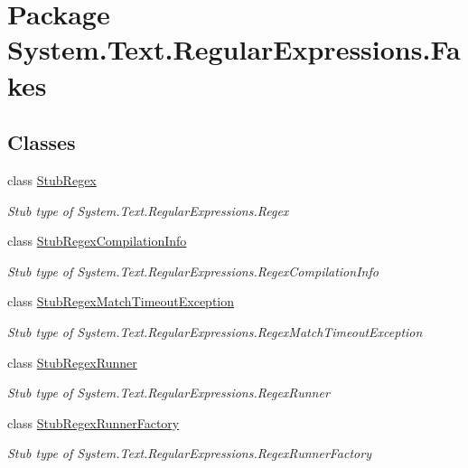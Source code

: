 \hypertarget{namespace_system_1_1_text_1_1_regular_expressions_1_1_fakes}{\section{Package System.\-Text.\-Regular\-Expressions.\-Fakes}
\label{namespace_system_1_1_text_1_1_regular_expressions_1_1_fakes}
}
\subsection*{Classes}
\begin{DoxyCompactItemize}
\item 
class \hyperlink{class_system_1_1_text_1_1_regular_expressions_1_1_fakes_1_1_stub_regex}{Stub\-Regex}
\begin{DoxyCompactList}\small\item\em Stub type of System.\-Text.\-Regular\-Expressions.\-Regex\end{DoxyCompactList}\item 
class \hyperlink{class_system_1_1_text_1_1_regular_expressions_1_1_fakes_1_1_stub_regex_compilation_info}{Stub\-Regex\-Compilation\-Info}
\begin{DoxyCompactList}\small\item\em Stub type of System.\-Text.\-Regular\-Expressions.\-Regex\-Compilation\-Info\end{DoxyCompactList}\item 
class \hyperlink{class_system_1_1_text_1_1_regular_expressions_1_1_fakes_1_1_stub_regex_match_timeout_exception}{Stub\-Regex\-Match\-Timeout\-Exception}
\begin{DoxyCompactList}\small\item\em Stub type of System.\-Text.\-Regular\-Expressions.\-Regex\-Match\-Timeout\-Exception\end{DoxyCompactList}\item 
class \hyperlink{class_system_1_1_text_1_1_regular_expressions_1_1_fakes_1_1_stub_regex_runner}{Stub\-Regex\-Runner}
\begin{DoxyCompactList}\small\item\em Stub type of System.\-Text.\-Regular\-Expressions.\-Regex\-Runner\end{DoxyCompactList}\item 
class \hyperlink{class_system_1_1_text_1_1_regular_expressions_1_1_fakes_1_1_stub_regex_runner_factory}{Stub\-Regex\-Runner\-Factory}
\begin{DoxyCompactList}\small\item\em Stub type of System.\-Text.\-Regular\-Expressions.\-Regex\-Runner\-Factory\end{DoxyCompactList}\end{DoxyCompactItemize}
